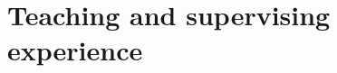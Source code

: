 \documentclass{scrartcl}
\begin{document}
\section*{Teaching and supervising experience}
\label{sec:Teaching}

\end{document}
